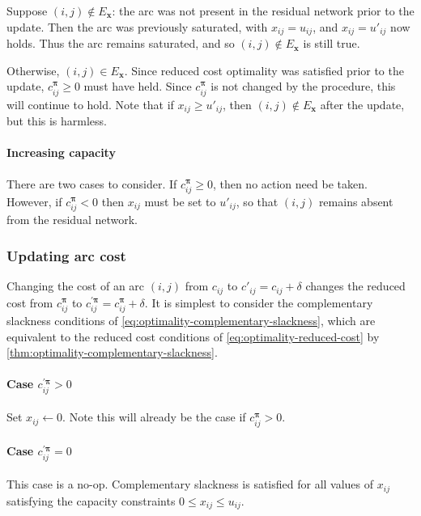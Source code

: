 Suppose $(i,j) \not \in E_\mathbf{x}$: the arc was not present in the residual network prior to the update. Then the arc was previously saturated, with $x_{ij} = u_{ij}$, and $x_{ij} = u'_{ij}$ now holds. Thus the arc remains saturated, and so $(i,j) \not \in E_\mathbf{x}$ is still true.

Otherwise, $(i,j) \in E_\mathbf{x}$. Since reduced cost optimality was satisfied prior to the update, $c_{ij}^{\boldsymbol{\pi}} \geq 0$ must have held. Since $c_{ij}^{\boldsymbol{\pi}}$ is not changed by the procedure, this will continue to hold. Note that if $x_{ij} \geq u'_{ij}$, then $(i,j) \not \in E_\mathbf{x}$ after the update, but this is harmless.

\paragraph{Increasing capacity} 
There are two cases to consider. If $c_{ij}^{\boldsymbol{\pi}} \geq 0$, then no action need be taken. However, if $c_{ij}^{\boldsymbol{\pi}} < 0$ then $x_{ij}$ must be set to $u'_{ij}$, so that $(i,j)$ remains absent from the residual network.

\subsubsection{Updating arc cost}

Changing the cost of an arc $(i,j)$ from $c_{ij}$ to $c'_{ij} = c_{ij} + \delta$ changes the reduced cost from $c_{ij}^{\boldsymbol{\pi}}$ to $c_{ij}^{\prime\boldsymbol{\pi}} = c_{ij}^{\boldsymbol{\pi}} + \delta$. It is simplest to consider the complementary slackness conditions of \cref{eq:optimality-complementary-slackness}, which are equivalent to the reduced cost conditions of \cref{eq:optimality-reduced-cost} by \cref{thm:optimality-complementary-slackness}.

\paragraph{Case $c_{ij}^{\prime\boldsymbol{\pi}} > 0$}
Set $x_{ij} \gets 0$. Note this will already be the case if $c_{ij}^{\boldsymbol{\pi}} > 0$.

\paragraph{Case $c_{ij}^{\prime\boldsymbol{\pi}} = 0$}
This case is a no-op. Complementary slackness is satisfied for all values of $x_{ij}$ satisfying the capacity constraints $0 \leq x_{ij} \leq u_{ij}$.

